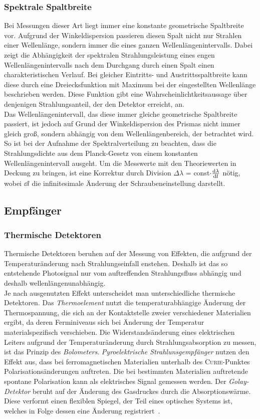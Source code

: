 \documentclass[a4paper,twoside,final]{article}
\begin{document}
\subsubsection{Spektrale Spaltbreite}
Bei Messungen dieser Art liegt immer eine konstante geometrische Spaltbreite vor. Aufgrund der Winkeldispersion passieren diesen Spalt nicht nur Strahlen einer Wellenlänge, sondern immer die eines ganzen Wellenlängenintervalls. Dabei zeigt die Abhängigkeit der spektralen Strahlungsleistung eines engen Wellenlängenintervalls nach dem Durchgang durch einen Spalt einen charakteristischen Verlauf. Bei gleicher Eintritts- und Austrittsspaltbreite kann diese durch eine Dreiecksfunktion mit Maximum bei der eingestellten Wellenlänge beschrieben werden. Diese Funktion gibt eine Wahrscheinlichtkeitsaussage über denjenigen Strahlungsanteil, der den Detektor erreicht, an. \\
Das Wellenlängenintervall, das diese immer gleiche geometrische Spaltbreite passiert, ist jedoch auf Grund der Winkeldispersion des Prismas nicht immer gleich groß, sondern abhängig von dem Wellenlängenbereich, der betrachtet wird. So ist bei der Aufnahme der Spektralverteilung zu beachten, dass die Strahlungsdichte aus dem Planck-Gesetz von einem konstanten Wellenlängenintervall ausgeht. Um die Messwerte mit den Theoriewerten in Deckung zu bringen, ist eine Korrektur durch Division $\Delta \lambda$ = const$\cdot \dv{\lambda}{l}$ nötig, wobei $\dd{l}$ die infinitesimale Änderung der Schraubeneinstellung darstellt.

\subsection{Empfänger}
\subsubsection{Thermische Detektoren}\label{sec:Empfänger}
Thermische Detektoren beruhen auf der Messung von Effekten, die aufgrund der Temperaturänderung nach Strahlungseinfall enstehen. Deshalb ist das so entstehende Photosignal nur vom auftreffenden Strahlungsfluss abhängig und deshalb wellenlängenunabhängig. \\
Je nach ausgenutzten Effekt unterscheidet man unterschiedliche thermische Detektoren. Das \emph{Thermoelement} nutzt die temperaturabhängige Änderung der Thermospannung, die sich an der Kontaktstelle zweier verschiedener Materialien ergibt, da deren Ferminiveaus sich bei Änderung der Temperatur materialspezifisch verschieben.
Die Widerstandsänderung eines elektrischen Leiters aufgrund der Temperaturänderung durch Strahlungsabsorption zu messen, ist das Prinzip des \emph{Bolometers}.
\emph{Pyroelektrische Strahlunsgempfänger} nutzen den Effekt aus, dass bei ferromagnetischen Materialien unterhalb des \textsc{Curie}-Punktes Polarisationsänderungen auftreten. Die bei bestimmten Materialien auftretende spontane Polarisation kann als elektrisches Signal gemessen werden. Der \emph{Golay-Detektor} beruht auf der Änderung des Gasdruckes durch die Absorptionswärme. Diese verformt einen flexiblen Spiegel, der Teil eines optisches Systems ist, welches in Folge dessen eine Änderung registriert~\cite{Gunzler}.
\end{document}
